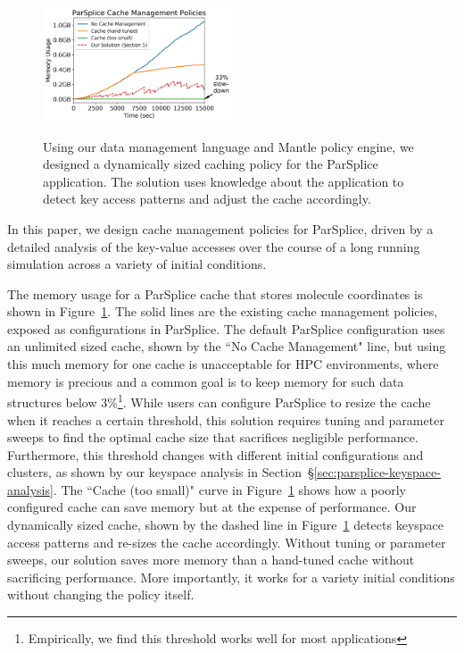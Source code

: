 \begin{figure}[t]
\noindent\includegraphics[width=0.5\textwidth]{figures/cache-management.png}\\

\caption{Using our data management language and Mantle policy engine, we
designed a dynamically sized caching policy for the ParSplice application. The
solution uses knowledge about the application to detect key access patterns and
adjust the cache accordingly. 
\label{fig:cache-management}}
\end{figure}

In this paper, we design cache management policies for ParSplice, driven by a
detailed analysis of the key-value accesses over the course of a long running
simulation across a variety of initial conditions.

The memory usage for a ParSplice cache that stores molecule coordinates is
shown in Figure~\ref{fig:cache-management}. The solid lines are the existing
cache management policies, exposed as configurations in ParSplice.  The default
ParSplice configuration uses an unlimited sized cache, shown by the ``No Cache
Management" line, but using this much memory for one cache is unacceptable for
HPC environments, where memory is precious and a common goal is to keep memory
for such data structures below 3\%\footnote{Empirically, we find this threshold
works well for most applications}.  While users can configure ParSplice to
resize the cache when it reaches a certain threshold, this solution requires
tuning and parameter sweeps to find the optimal cache size that sacrifices
negligible performance.  Furthermore, this threshold changes with different
initial configurations and clusters, as shown by our keyspace analysis in
Section~\S\ref{sec:parsplice-keyspace-analysis}.  The ``Cache (too small)"
curve in Figure~\ref{fig:cache-management} shows how a poorly configured cache
can save memory but at the expense of performance.  Our dynamically sized
cache, shown by the dashed line in Figure~\ref{fig:cache-management} detects
keyspace access patterns and re-sizes the cache accordingly.  Without tuning or
parameter sweeps, our solution saves more memory than a hand-tuned cache
without sacrificing performance.  More importantly, it works for a variety
initial conditions without changing the policy itself.

